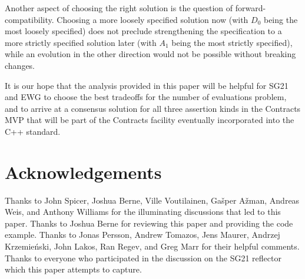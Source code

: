 Another aspect of choosing the right solution is the question of forward-compatibility. Choosing a more loosely specified solution now (with $D_0$ being the most loosely specified) does not preclude strengthening the specification to a more strictly specified solution later (with $A_1$ being the most strictly specified), while an evolution in the other direction would not be possible without breaking changes.

It is our hope that the analysis provided in this paper will be helpful for SG21 and EWG to choose the best tradeoffs for the number of evaluations problem, and to arrive at a consensus solution for all three assertion kinds in the Contracts MVP that will be part of the Contracts facility eventually incorporated into the C++ standard.



\section*{Acknowledgements}
Thanks to John Spicer,  Joshua Berne, Ville Voutilainen, Ga\v sper A\v zman, Andreas Weis, and Anthony Williams for the illuminating discussions that led to this paper. Thanks to Joshua Berne for reviewing this paper and providing the  code example. Thanks to Jonas Persson, Andrew Tomazos, Jens Maurer, Andrzej Krzemie\' nski, John Lakos, Ran Regev, and Greg Marr for their helpful comments. Thanks to everyone who participated in the discussion on the SG21 reflector which this paper attempts to capture.


\renewcommand{\addcontentsline}[3]{}%






